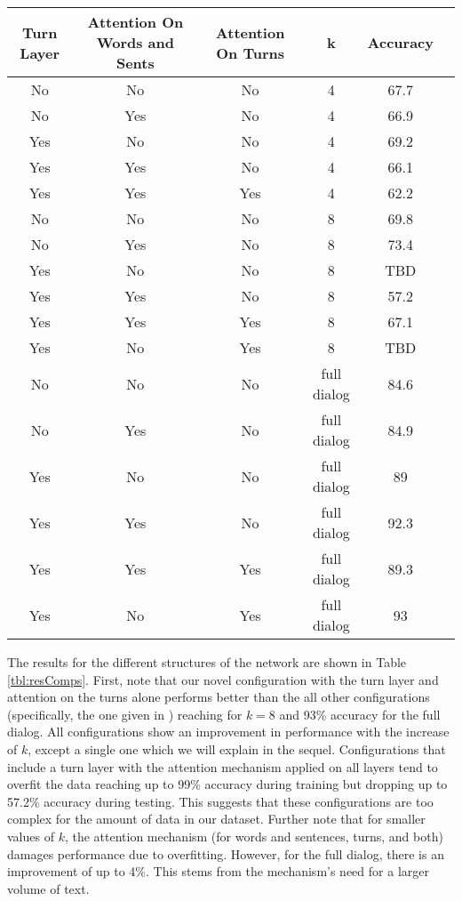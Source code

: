 \begin{table*}[!htb]
    \centering\small
    \begin{tabular}{| c | c | c | c | c | c |}
        \hline \textbf{Turn Layer} & {\bf Attention On Words and Sents} & \textbf{Attention On Turns} & \textbf{k} & \textbf{Accuracy} \\
        \hline No & No & No & 4 & 67.7 \\
        \hline No & Yes & No & 4 & 66.9 \\
        \hline Yes & No & No & 4 & 69.2 \\
        \hline Yes & Yes & No & 4 & 66.1 \\
        \hline Yes & Yes & Yes & 4 & 62.2 \\
        \hline No & No & No & 8 & 69.8 \\
        \hline No & Yes & No & 8 & 73.4 \\
        \hline Yes & No & No & 8 & TBD \\
        \hline Yes & Yes & No & 8 & 57.2 \\
        \hline Yes & Yes & Yes & 8 & 67.1 \\
        \hline Yes & No & Yes & 8 & TBD \\
        \hline No & No & No & full dialog & 84.6 \\
        \hline No & Yes & No & full dialog & 84.9 \\
        \hline Yes & No & No & full dialog & 89 \\
        \hline Yes & Yes & No & full dialog & 92.3 \\
        \hline Yes & Yes & Yes & full dialog & 89.3 \\
        \hline Yes & No & Yes & full dialog & 93 \\
        
        \hline
    \end{tabular}
    \caption{Accuracy in Dialog-End Classification}\label{tbl:resComps}
\end{table*}

The results for the different structures of the network are shown in Table \ref{tbl:resComps}. 
First, note that our novel configuration with the turn layer and attention on the turns alone 
performs better than the all other configurations (specifically, the one given in \cite{attention}) 
reaching  for $k=8$ and 93\% accuracy for the full dialog. 
All configurations show an improvement in performance with the increase of $k$, 
except a single one which we will explain in the sequel. 
Configurations that include a turn layer with the attention mechanism applied on all layers 
tend to overfit the data reaching up to 99\% accuracy during training but 
dropping up to 57.2\% accuracy during testing. 
This suggests that these configurations are too complex for the amount of data in our dataset. 
Further note that for smaller values of $k$, the attention mechanism 
(for words and sentences, turns, and both) damages performance due to overfitting. 
However, for the full dialog, there is an improvement of up to 4\%. 
This stems from the mechanism's need for a larger volume of text.


